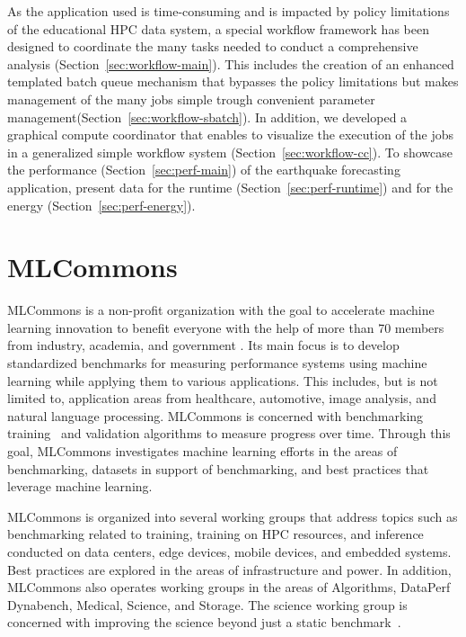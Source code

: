 \documentclass[utf8]{FrontiersinVancouver} %
\begin{document}
As the application used is time-consuming and is impacted by policy
limitations of the educational HPC data system, a special workflow
framework has been designed to coordinate the many tasks needed to
conduct a comprehensive analysis
(Section~\ref{sec:workflow-main}). This includes the creation of an
enhanced templated batch queue mechanism that bypasses the policy
limitations but makes management of the many jobs simple trough
convenient parameter management(Section~\ref{sec:workflow-sbatch}). In
addition, we developed a graphical compute coordinator that enables to
visualize the execution of the jobs in a generalized simple workflow
system (Section~\ref{sec:workflow-cc}).  To showcase the performance
(Section~\ref{sec:perf-main}) of the earthquake forecasting
application, present data for the runtime
(Section~\ref{sec:perf-runtime}) and for the energy
(Section~\ref{sec:perf-energy}).


\section{MLCommons}
\label{sec:mlcommons}

MLCommons is a non-profit organization with the goal to
accelerate machine learning innovation to benefit everyone with the
help of more than 70 members from industry, academia, and government
\citep{www-mlcommons}. Its main focus is to develop standardized
benchmarks for measuring performance systems using machine
learning while applying them to various applications. This includes,
but is not limited to, application areas from healthcare, automotive,
image analysis, and natural language processing. MLCommons is
concerned with benchmarking training~\citep{mlperf-training} and
validation algorithms to measure progress over time. Through this goal,
MLCommons investigates machine learning efforts in the areas of
benchmarking, datasets in support of benchmarking, and best practices
that leverage machine learning.

MLCommons is organized into several working groups that address topics
such as benchmarking related to training, training on HPC resources,
and inference conducted on data centers, edge devices, mobile devices, and
embedded systems. Best practices are explored in the areas of
infrastructure and power. In addition, MLCommons also operates
working groups in the areas of Algorithms, DataPerf Dynabench,
Medical, Science, and Storage. The science working group is concerned
with improving the science beyond just a static
benchmark~\citep{las-22-mlcommons-science}.
\end{document}
